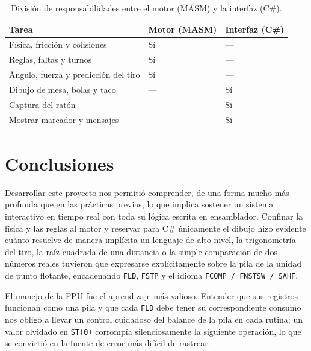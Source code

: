 \documentclass[a4paper,12pt]{article}
\begin{document}
\begin{table}[H]
\centering
\caption{División de responsabilidades entre el motor (MASM) y la interfaz (C\#).}
\label{tab:division}
\small
\renewcommand{\arraystretch}{1.25}
\begin{tabular}{
    >{\raggedright\arraybackslash}p{6.5cm}
    >{\centering\arraybackslash}p{3.2cm}
    >{\centering\arraybackslash}p{3.2cm}
}
\toprule
\rowcolor{VerdeUABC}
\color{white}\textbf{Tarea} &
\color{white}\textbf{Motor (MASM)} &
\color{white}\textbf{Interfaz (C\#)} \\
\midrule
\rowcolor{rowLight}
Física, fricción y colisiones & Sí & --- \\
Reglas, faltas y turnos & Sí & --- \\
\rowcolor{rowLight}
Ángulo, fuerza y predicción del tiro & Sí & --- \\
Dibujo de mesa, bolas y taco & --- & Sí \\
\rowcolor{rowLight}
Captura del ratón & --- & Sí \\
Mostrar marcador y mensajes & --- & Sí \\
\bottomrule
\end{tabular}
\end{table}

\newpage
\section{Conclusiones}
Desarrollar este proyecto nos permitió comprender, de una forma mucho más profunda que en las prácticas previas, lo que implica sostener un sistema interactivo en tiempo real con toda su lógica escrita en ensamblador. Confinar la física y las reglas al motor y reservar para C\# únicamente el dibujo hizo evidente cuánto resuelve de manera implícita un lenguaje de alto nivel, la trigonometría del tiro, la raíz cuadrada de una distancia o la simple comparación de dos números reales tuvieron que expresarse explícitamente sobre la pila de la unidad de punto flotante, encadenando \texttt{FLD}, \texttt{FSTP} y el idioma \texttt{FCOMP\,/\,FNSTSW\,/\,SAHF}.

El manejo de la FPU fue el aprendizaje más valioso. Entender que sus registros funcionan como una pila y que cada \texttt{FLD} debe tener su correspondiente consumo nos obligó a llevar un control cuidadoso del balance de la pila en cada rutina; un valor olvidado en \texttt{ST(0)} corrompía silenciosamente la siguiente operación, lo que se convirtió en la fuente de error más difícil de rastrear.
\end{document}
